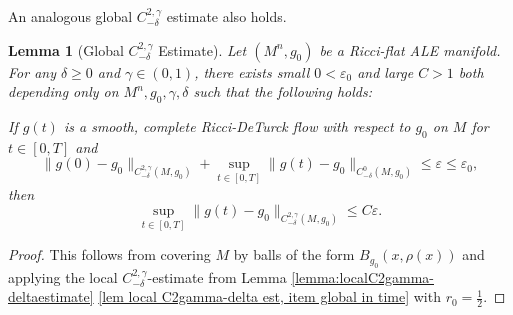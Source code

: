 \documentclass[12pt]{amsart}
\renewcommand{\1}{{\mathbf 1}}
\newcommand{\eps}{{\varepsilon}}
\newtheorem{lemma}[thm]{Lemma}
\theoremstyle{others}
\numberwithin{equation}{section}
\begin{document}
An analogous global $C^{2, \gamma}_{-\delta}$ estimate also holds.

\begin{lemma}[Global $C^{2, \gamma}_{-\delta}$ Estimate]\label{lemma:globalC2gamma-deltaestimate}
    Let $(M^n, g_0)$ be a Ricci-flat ALE manifold.
    For any $\delta \geq 0$ and $\gamma \in (0,1)$,
    there exists small $0 < \eps_0$ and large $C>1$ 
    both depending only on $M^n , g_0, \gamma, \delta$ such that the following holds:

    If $g(t)$ is a smooth, complete Ricci-DeTurck flow with respect to $g_0$ on $M$ for $t \in [0,T]$ and 
        $$\| g(0) - g_0 \|_{C^{2, \gamma}_{-\delta}(M, g_0) } + \sup_{t \in [0, T]} \| g(t) - g_0 \|_{C^0_{-\delta}(M, g_0)} \le \eps \leq \eps_0 ,$$
    then
        $$\sup_{t \in [0,T]} \| g(t) - g_0 \|_{C^{2, \gamma}_{-\delta}(M, g_0)}
        \le C \eps.$$ %
\end{lemma}
\begin{proof}
    This follows from covering $M$ by balls of the form $B_{g_0}( x, \rho(x) )$ and applying the local $C^{2, \gamma}_{-\delta}$-estimate from Lemma \ref{lemma:localC2gamma-deltaestimate} \eqref{lem local C2gamma-delta est, item global in time} with $r_0 = \frac12$.
\end{proof}
\end{document}
